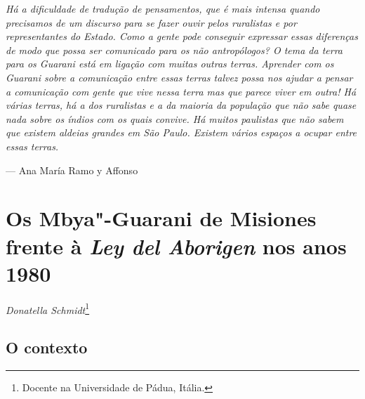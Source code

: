 \clearpage

\vspace*{\fill}

\begin{flushright}
\begin{minipage}[c]{0.85\textwidth}
\raggedleft
\footnotesize
\emph{Há a dificuldade de tradução de pensamentos, que é mais intensa quando
precisamos de um discurso para se fazer ouvir pelos ruralistas e por
representantes do Estado. Como a gente pode conseguir expressar essas
diferenças de modo que possa ser comunicado para os não antropólogos? O
tema da terra para os Guarani está em ligação com muitas outras terras.
Aprender com os Guarani sobre a comunicação entre essas terras talvez
possa nos ajudar a pensar a comunicação com gente que vive nessa terra
mas que parece viver em outra! Há várias terras, há a dos ruralistas e
a da maioria da população que não sabe quase nada sobre os índios com
os quais convive. Há muitos paulistas que não sabem que existem aldeias
grandes em São Paulo. Existem vários espaços a ocupar entre essas
terras.}

\smallskip
\hspace*{\fill}--- Ana María Ramo y Affonso
\end{minipage}
\end{flushright}

\thispagestyle{empty}

\chapter*{Os Mbya"-Guarani de Misiones frente à \emph{Ley del Aborigen} nos anos 1980}


\begin{flushright}
\emph{Donatella Schmidt}\footnote{Docente na Universidade de Pádua, Itália.}
\end{flushright}
\medskip

\section{O contexto}


